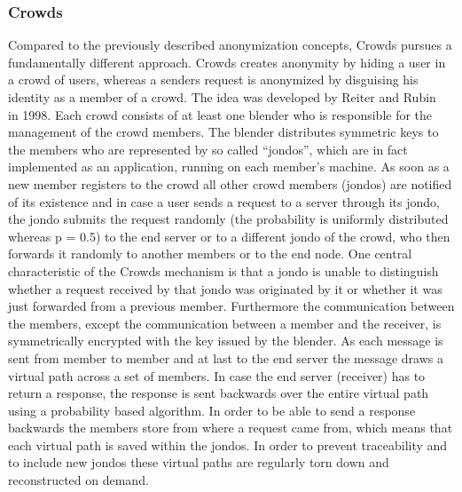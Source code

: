 \documentclass{sig-alternate}
\begin{document}
\subsubsection {Crowds}
Compared to the previously described anonymization concepts, Crowds pursues a fundamentally different approach. Crowds creates anonymity by hiding a user in a crowd of users, whereas a senders request is anonymized by disguising his identity as a member of a crowd. The idea was developed by Reiter and Rubin~\cite{reiter1998crowds} in 1998. Each crowd consists of at least one blender who is responsible for the management of the crowd members. The blender distributes symmetric keys to the members who are represented by so called ``jondos'', which are in fact implemented as an application, running on each member's machine. As soon as a new member registers to the crowd all other crowd members (jondos) are notified of its existence and in case a user sends a request to a server through its jondo, the jondo submits the request randomly (the probability is uniformly distributed whereas p = 0.5) to the end server or to a different jondo of the crowd, who then forwards it randomly to another members or to the end node. One central characteristic of the Crowds mechanism is that a jondo is unable to distinguish whether a request received by that jondo was originated by it or whether it was just forwarded from a previous member. Furthermore the communication between the members, except the communication between a member and the receiver, is symmetrically encrypted with the key issued by the blender. As each message is sent from member to member and at last to the end server the message draws a virtual path across a set of members. In case the end server (receiver) has to return a response, the response is sent backwards over the entire virtual path using a probability based algorithm. In order to be able to send a response backwards the members store from where a request came from, which means that each virtual path is saved within the jondos. In order to prevent traceability and to include new jondos these virtual paths are regularly torn down and reconstructed on demand. 
\end{document}
